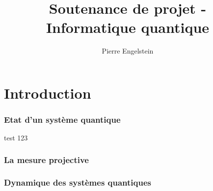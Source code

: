\documentclass{beamer}
\title{Soutenance de projet - Informatique quantique}
\author{Pierre Engelstein}
\institute{Polytech Angers}
\begin{document}

\frame{\titlepage}








% 


\section{Introduction}

\begin{frame}
\frametitle{Etat d'un système quantique}

\begin{definition}
  test 123
\end{definition}
\end{frame}

\begin{frame}
\frametitle{La mesure projective}
\end{frame}

\begin{frame}
\frametitle{Dynamique des systèmes quantiques}
\end{frame}


\end{document}
